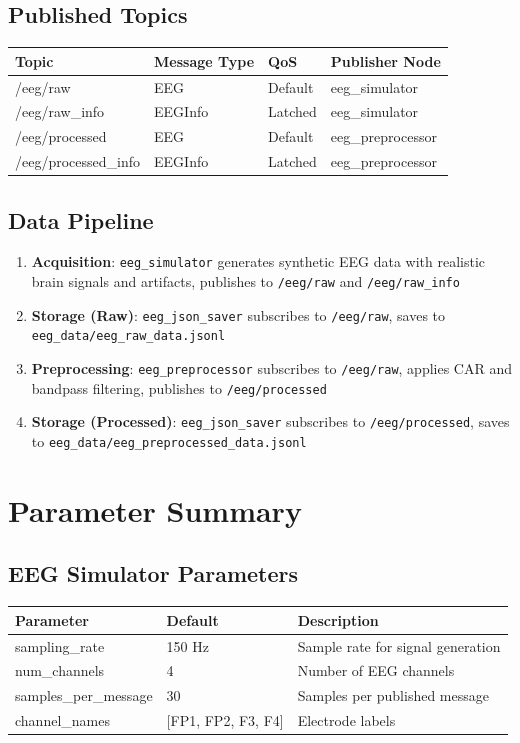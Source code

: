 \documentclass[11pt,a4paper]{article}
\begin{document}
\subsection{Published Topics}
\begin{longtable}{|>{\small}p{3.5cm}|>{\small}p{3cm}|>{\small}p{2cm}|>{\small}p{4cm}|}
\hline
\textbf{Topic} & \textbf{Message Type} & \textbf{QoS} & \textbf{Publisher Node} \\
\hline
/eeg/raw & EEG & Default & eeg\_simulator \\
/eeg/raw\_info & EEGInfo & Latched & eeg\_simulator \\
/eeg/processed & EEG & Default & eeg\_preprocessor \\
/eeg/processed\_info & EEGInfo & Latched & eeg\_preprocessor \\
\hline
\end{longtable}

\subsection{Data Pipeline}
\begin{enumerate}
    \item \textbf{Acquisition}: \texttt{eeg\_simulator} generates synthetic EEG data with realistic brain signals and artifacts, publishes to \texttt{/eeg/raw} and \texttt{/eeg/raw\_info}
    \item \textbf{Storage (Raw)}: \texttt{eeg\_json\_saver} subscribes to \texttt{/eeg/raw}, saves to \texttt{eeg\_data/eeg\_raw\_data.jsonl}
    \item \textbf{Preprocessing}: \texttt{eeg\_preprocessor} subscribes to \texttt{/eeg/raw}, applies CAR and bandpass filtering, publishes to \texttt{/eeg/processed}
    \item \textbf{Storage (Processed)}: \texttt{eeg\_json\_saver} subscribes to \texttt{/eeg/processed}, saves to \texttt{eeg\_data/eeg\_preprocessed\_data.jsonl}
\end{enumerate}

\section{Parameter Summary}

\subsection{EEG Simulator Parameters}
\begin{longtable}{|>{\small}p{3.5cm}|>{\small}p{2.5cm}|>{\small}p{7cm}|}
\hline
\textbf{Parameter} & \textbf{Default} & \textbf{Description} \\
\hline
sampling\_rate & 150 Hz & Sample rate for signal generation \\
num\_channels & 4 & Number of EEG channels \\
samples\_per\_message & 30 & Samples per published message \\
channel\_names & [FP1, FP2, F3, F4] & Electrode labels \\
\hline
\end{longtable}
\end{document}
